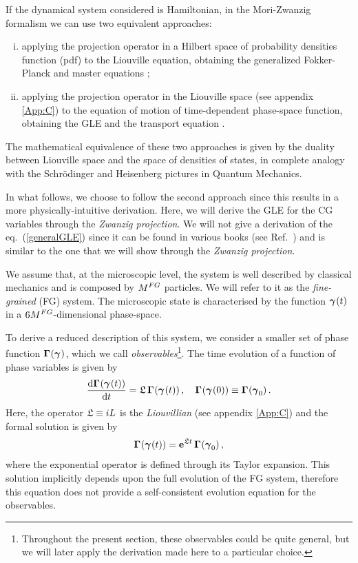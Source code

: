 \documentclass[10pt,a4paper]{book}
\theoremstyle{definition}
\begin{document}
If the dynamical system considered is Hamiltonian, in the Mori-Zwanzig formalism we can use two equivalent approaches:
\begin{enumerate}[(i)]
  \item applying the projection operator in a Hilbert space of probability densities function (pdf) to the Liouville equation, obtaining the generalized Fokker-Planck and master equations \cite{Kinjo2007,Zwanzig1960,Zwanzig1961,Zwanzig1964};
  \item applying the projection operator in the Liouville space (see appendix \ref{App:C}) to the equation of motion of time-dependent phase-space function, obtaining the GLE and the transport equation \cite{DiPasquale2019,Hijon2010,Mori1965,Nordholm1975,Zwanzig1973}.
\end{enumerate}
The mathematical equivalence of these two approaches is given by the duality between Liouville space and the space of densities of states, in complete analogy with the Schr\"odinger and Heisenberg pictures in Quantum Mechanics. 

\noindent
In what follows, we choose to follow the second approach since this results in a more physically-intuitive derivation.
Here, we will derive the GLE for the CG variables through the \emph{Zwanzig projection}. We will not give a derivation of the eq.~(\ref{generalGLE}) since it can be found in various books (see Ref.~\cite{Berne:DynamicLightScatt,evans2008,hansen2006,tuckerman2010}) and is similar to the one that we will show through the \emph{Zwanzig projection}.

We assume that, at the microscopic level, the system is well described by classical mechanics and is composed by $M^{FG}$ particles. We will refer to it as the \emph{fine-grained} (FG) system. The microscopic state is characterised by the function $\boldsymbol\gamma_{}(t)$ in a $6M^{FG}$-dimensional phase-space. 

\noindent
To derive a reduced description of this system, we consider a smaller set of phase function $\boldsymbol\Gamma_{}(\boldsymbol\gamma_{})$, which we call \emph{observables}\footnote{
Throughout the present section, these observables could be quite general, but we will later apply the derivation made here to a particular choice.
}.
The time evolution of a function of phase variables is given by
\begin{equation}\label{Eq:MotionEqGamma}
  \frac{\mbox{d}\boldsymbol\Gamma_{}(\boldsymbol\gamma_{}(t))}{\mbox{d}t} = \mathfrak{L}\,\boldsymbol\Gamma_{}(\boldsymbol\gamma_{}(t))\,,
  \quad\boldsymbol\Gamma_{}(\boldsymbol\gamma_{}(0)) \equiv \boldsymbol\Gamma_{}(\boldsymbol\gamma_{0})\,.
\end{equation}
Here, the operator $\mathfrak{L}\equiv iL$ is the \emph{Liouvillian} (see appendix \ref{App:C}) and the formal solution is given by
\begin{equation}\label{Eq:SolLiouville}
	\boldsymbol\Gamma_{}(\boldsymbol\gamma_{}(t)) = \mathbf{e}^{\mathfrak{L} t}\,\boldsymbol\Gamma_{}(\boldsymbol\gamma_{0})\,,
\end{equation}
where the exponential operator is defined through its Taylor expansion.
This solution implicitly depends upon the full evolution of the FG system, therefore this equation does not provide a self-consistent evolution equation for the observables. 
\end{document}
